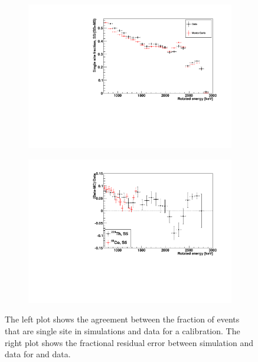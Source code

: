 \documentclass[herrin-thesis.tex]{subfiles}
\begin{document}
\begin{figure}[htp]
\centering
	\begin{subfigure}[b]{0.48\textwidth}
	\centering
	\includegraphics[width=\textwidth]{./plots/analysis_ssfrac_agreement.pdf}
	\end{subfigure}\hfill%
	\begin{subfigure}[b]{0.48\textwidth}
	\centering
	\includegraphics[width=\textwidth]{./plots/analysis_ssfrac_residuals.pdf}
	\end{subfigure}
\caption[Single site fraction agreement between simulation and data]{The left plot shows the agreement between the fraction of events that are single site in simulations and data for a  calibration. The right plot shows the fractional residual error between simulation and data for  and  data.}
\label{fig:analysis_ssfrac_agreement}
\end{figure}
\end{document}
